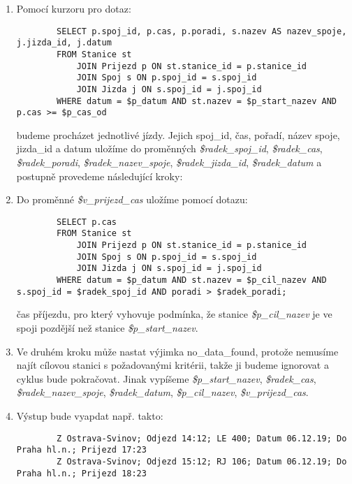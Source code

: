 \documentclass[11pt]{article}
\begin{document}
\begin{enumerate}
    \item Pomocí kurzoru pro dotaz:
    \begin{lstlisting}
        SELECT p.spoj_id, p.cas, p.poradi, s.nazev AS nazev_spoje, j.jizda_id, j.datum
        FROM Stanice st
            JOIN Prijezd p ON st.stanice_id = p.stanice_id
            JOIN Spoj s ON p.spoj_id = s.spoj_id
            JOIN Jizda j ON s.spoj_id = j.spoj_id
        WHERE datum = $p_datum AND st.nazev = $p_start_nazev AND p.cas >= $p_cas_od
    \end{lstlisting}
    budeme procházet jednotlivé jízdy. Jejich spoj\_id, čas, pořadí, název spoje, jizda\_id a datum uložíme do proměnných \textit{\$radek\_spoj\_id}, \textit{\$radek\_cas}, \textit{\$radek\_poradi}, \textit{\$radek\_nazev\_spoje}, \textit{\$radek\_jizda\_id}, \textit{\$radek\_datum} a postupně provedeme následující kroky:
    
    \item Do proměnné \textit{\$v\_prijezd\_cas} uložíme pomocí dotazu:
    \begin{lstlisting}
        SELECT p.cas
        FROM Stanice st
            JOIN Prijezd p ON st.stanice_id = p.stanice_id
            JOIN Spoj s ON p.spoj_id = s.spoj_id
            JOIN Jizda j ON s.spoj_id = j.spoj_id
        WHERE datum = $p_datum AND st.nazev = $p_cil_nazev AND s.spoj_id = $radek_spoj_id AND poradi > $radek_poradi;
    \end{lstlisting}
    čas příjezdu, pro který vyhovuje podmínka, že stanice \textit{\$p\_cil\_nazev} je ve spoji pozdější než stanice \textit{\$p\_start\_nazev}.

    \item Ve druhém kroku může nastat výjimka no\_data\_found, protože nemusíme najít cílovou stanici s požadovanými kritérii, takže ji budeme ignorovat a cyklus bude pokračovat. Jinak vypíšeme \textit{\$p\_start\_nazev}, \textit{\$radek\_cas}, \textit{\$radek\_nazev\_spoje}, \textit{\$radek\_datum}, \textit{\$p\_cil\_nazev}, \textit{\$v\_prijezd\_cas}.
 
    \item Výstup bude vyapdat např. takto:
    \begin{lstlisting}
        Z Ostrava-Svinov; Odjezd 14:12; LE 400; Datum 06.12.19; Do Praha hl.n.; Prijezd 17:23
        Z Ostrava-Svinov; Odjezd 15:12; RJ 106; Datum 06.12.19; Do Praha hl.n.; Prijezd 18:23
    \end{lstlisting}
\end{enumerate}
\end{document}
